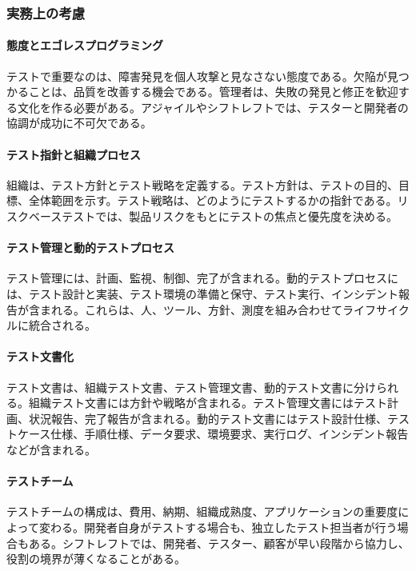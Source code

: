 \subsubsection{実務上の考慮}
\paragraph{態度とエゴレスプログラミング}
テストで重要なのは、障害発見を個人攻撃と見なさない態度である。欠陥が見つかることは、品質を改善する機会である。管理者は、失敗の発見と修正を歓迎する文化を作る必要がある。アジャイルやシフトレフトでは、テスターと開発者の協調が成功に不可欠である。

\paragraph{テスト指針と組織プロセス}
組織は、テスト方針とテスト戦略を定義する。テスト方針は、テストの目的、目標、全体範囲を示す。テスト戦略は、どのようにテストするかの指針である。リスクベーステストでは、製品リスクをもとにテストの焦点と優先度を決める。

\paragraph{テスト管理と動的テストプロセス}
テスト管理には、計画、監視、制御、完了が含まれる。動的テストプロセスには、テスト設計と実装、テスト環境の準備と保守、テスト実行、インシデント報告が含まれる。これらは、人、ツール、方針、測度を組み合わせてライフサイクルに統合される。

\paragraph{テスト文書化}
テスト文書は、組織テスト文書、テスト管理文書、動的テスト文書に分けられる。組織テスト文書には方針や戦略が含まれる。テスト管理文書にはテスト計画、状況報告、完了報告が含まれる。動的テスト文書にはテスト設計仕様、テストケース仕様、手順仕様、データ要求、環境要求、実行ログ、インシデント報告などが含まれる。

\paragraph{テストチーム}
テストチームの構成は、費用、納期、組織成熟度、アプリケーションの重要度によって変わる。開発者自身がテストする場合も、独立したテスト担当者が行う場合もある。シフトレフトでは、開発者、テスター、顧客が早い段階から協力し、役割の境界が薄くなることがある。

